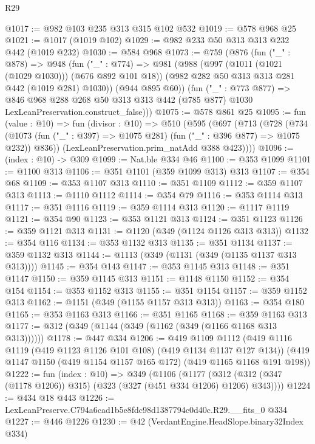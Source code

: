 \begin{lexlean}{R29}
\begin{coremodule}
@1017 := @982 @103 @235 @313 @315 @102 @532
@1019 := @578 @968 @25
@1021 := @1017 (@1019 @102)
@1029 := @982 @233 @50 @313 @313 @232 @442 (@1019 @232)
@1030 := @584 @968
@1073 := @759
    (@876
      (fun ("_" : @878) =>
      @948
        (fun ("_" : @774) =>
        @981
          (@988
            (@997 (@1011 (@1021 (@1029 @1030))) (@676 @892 @101 @18))
            (@982 @282 @50 @313 @313 @281 @442 (@1019 @281) @1030))
          (@944 @895 @60))
        (fun ("_" : @773 @877) =>
        @846
          @968
          @288
          @268
          @50
          @313
          @313
          @442
          (@785 @877)
          @1030
          LexLeanPreservation.construct_false)))
@1075 := @578 @861 @25
@1095 := fun (value : @10) =>
  fun (divisor : @10) =>
  @510
    (@595
      (@697
        (@713
          (@728
            (@734
              (@1073 (fun ("_" : @397) => @1075 @281) (fun ("_" : @396 @877) => @1075 @232))
              @836))
          (LexLeanPreservation.prim_natAdd @388 @423))))
@1096 := (index : @10) -> @309
@1099 := Nat.ble @334 @46
@1100 := @353 @1099
@1101 := @1100 @313
@1106 := @351 @1101 (@359 @1099 @313) @313
@1107 := @354 @68
@1109 := @353 @1107 @313
@1110 := @351 @1109
@1112 := @359 @1107 @313
@1113 := @1110 @1112
@1114 := @354 @79
@1116 := @353 @1114 @313
@1117 := @351 @1116
@1119 := @359 @1114 @313
@1120 := @1117 @1119
@1121 := @354 @90
@1123 := @353 @1121 @313
@1124 := @351 @1123
@1126 := @359 @1121 @313
@1131 := @1120 (@349 (@1124 @1126 @313 @313))
@1132 := @354 @116
@1134 := @353 @1132 @313
@1135 := @351 @1134
@1137 := @359 @1132 @313
@1144 := @1113 (@349 (@1131 (@349 (@1135 @1137 @313 @313))))
@1145 := @354 @143
@1147 := @353 @1145 @313
@1148 := @351 @1147
@1150 := @359 @1145 @313
@1151 := @1148 @1150
@1152 := @354 @154
@1154 := @353 @1152 @313
@1155 := @351 @1154
@1157 := @359 @1152 @313
@1162 := @1151 (@349 (@1155 @1157 @313 @313))
@1163 := @354 @180
@1165 := @353 @1163 @313
@1166 := @351 @1165
@1168 := @359 @1163 @313
@1177 := @312 (@349 (@1144 (@349 (@1162 (@349 (@1166 @1168 @313 @313))))))
@1178 := @447 @334
@1206 := @419
    @1109
    @1112
    (@419 @1116 @1119 (@419 @1123 @1126 @101 @108) (@419 @1134 @1137 @127 @134))
    (@419 @1147 @1150 (@419 @1154 @1157 @165 @172) (@419 @1165 @1168 @191 @198))
@1222 := fun (index : @10) =>
  @349
    (@1106
      (@1177 (@312 (@312 (@347 (@1178 @1206)) @315) (@323 (@327 (@451 @334 @1206) @1206) @343))))
@1224 := @434 @18 @443
@1226 := LexLeanPreserve.C794a6cad1b5e8fdc98d1387794c0d40c.R29.__fits_0 @334
@1227 := @446 @1226
@1230 := @42 (VerdantEngine.HeadSlope.binary32Index @334)

\end{coremodule}
\end{lexlean}
